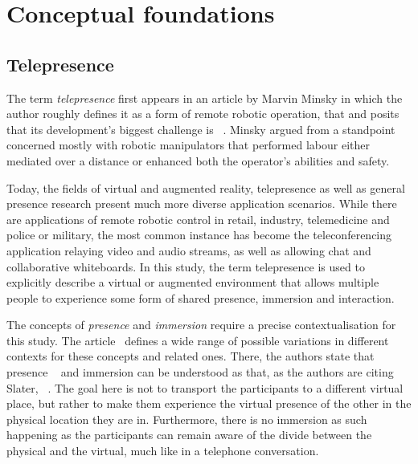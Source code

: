 \chapter{Conceptual foundations}
\label{ch:conceptualfoundations}

\section{Telepresence}\label{sec:telepresence}

The term \emph{telepresence} first appears in an article by Marvin Minsky in which the author roughly defines it as a form of remote robotic operation, that  and posits that its development's biggest challenge is ~\parencite{minskyTelepresence}.
Minsky argued from a standpoint concerned mostly with robotic manipulators that performed labour either mediated over a distance or enhanced both the operator's abilities and safety.

Today, the fields of virtual and augmented reality, telepresence as well as general presence research present much more diverse application scenarios.
While there are applications of remote robotic control in retail, industry, telemedicine and police or military, the most common instance has become the teleconferencing application relaying video and audio streams, as well as allowing chat and collaborative whiteboards.
In this study, the term telepresence is used to explicitly describe a virtual or augmented environment that allows multiple people to experience some form of shared presence, immersion and interaction.

The concepts of \emph{presence} and \emph{immersion} require a precise contextualisation for this study.
The article~ defines a wide range of possible variations in different contexts for these concepts and related ones.
There, the authors state that presence ~\parencite[2]{surveyOfPresence} and immersion can be understood as  that, as the authors are citing Slater, ~\parencite[3]{surveyOfPresence}.
The goal here is not to transport the participants to a different virtual place, but rather to make them experience the virtual presence of the other in the physical location they are in.
Furthermore, there is no immersion as such happening as the participants can remain aware of the divide between the physical and the virtual, much like in a telephone conversation.

